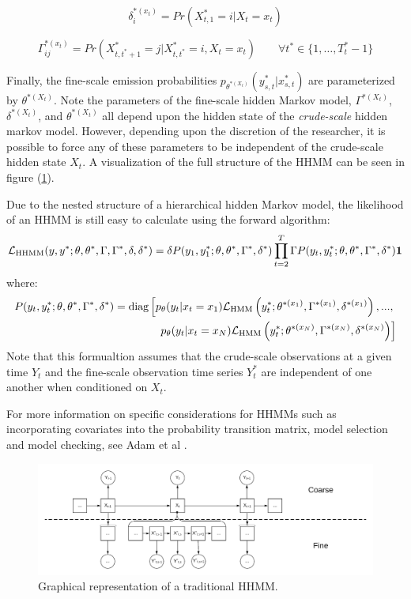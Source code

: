 $$\delta^{*(x_t)}_i = Pr(X^*_{t,1} = i | X_t = x_t)$$

$$\Gamma^{*(x_t)}_{ij} = Pr(X^*_{t,t^*+1} = j | X^*_{t,t^*} = i, X_t = x_t) \qquad \forall t^* \in \{ 1, \ldots, T^*_t-1\}$$

Finally, the fine-scale emission probabilities $p_{\theta^{*(X_t)}}(y^*_{s,t} | x^*_{s,t})$ are parameterized by $\theta^{*(X_t)}$. Note the parameters of the fine-scale hidden Markov model, $\Gamma^{*(X_t)}$, $\delta^{*(X_t)}$, and $\theta^{*(X_t)}$ all depend upon the hidden state of the \textit{crude-scale} hidden markov model. However, depending upon the discretion of the researcher, it is possible to force any of these parameters to be independent of the crude-scale hidden state $X_t$. A visualization of the full structure of the HHMM can be seen in figure (\ref{fig:HHMM}).

Due to the nested structure of a hierarchical hidden Markov model, the likelihood of an HHMM is still easy to calculate using the forward algorithm:
%
$$\mathcal{L}_{\text{HHMM}}(y,y^*;\theta,\theta^*,\Gamma,\Gamma^*,\delta,\delta^*) = \delta P(y_1,y_1^*;\theta,\theta^*,\Gamma^*,\delta^*) \prod_{t=2}^T \Gamma P(y_t,y_t^*;\theta,\theta^*,\Gamma^*,\delta^*) \mathbf{1}$$
%
where:
%
\begin{align*}
	P(y_t,y_t^*;\theta,\theta^*,\Gamma^*,\delta^*)  = \text{diag}\left[p_{\theta}(y_t|x_t = x_1)\mathcal{L}_{\text{HMM}}\left(y_t^*;\theta^{*(x_1)},\Gamma^{*(x_1)},\delta^{*(x_1)}\right), . . . , \right.\\
	\left. p_{\theta}(y_t|x_t = x_N )\mathcal{L}_{\text{HMM}}\left(y_t^*;\theta^{*(x_N)},\Gamma^{*(x_N)},\delta^{*(x_N)}\right) \right]
\end{align*}
%
Note that this formualtion assumes that the crude-scale observations at a given time $Y_t$ and the fine-scale observation time series $Y_t^*$ are independent of one another when conditioned on $X_t$.

For more information on specific considerations for HHMMs such as incorporating covariates into the probability transition matrix, model selection and model checking, see Adam et al \cite{Adam:2019}.

\begin{figure}[h!]
	\centering
	\includegraphics[width=6.5in]{../../Plots/HHMM.png}
	\caption{Graphical representation of a traditional HHMM.}
	\label{fig:HHMM}
\end{figure}


